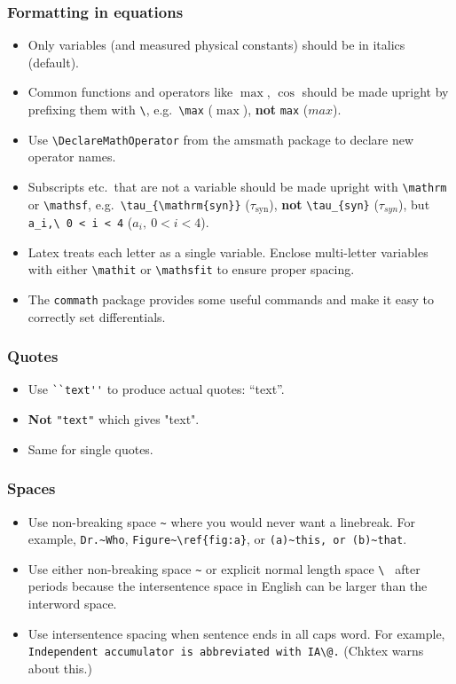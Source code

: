 \documentclass[aspectratio=1610]{beamer}
\begin{document}
\begin{frame}[fragile]
    \frametitle{Formatting in equations}
    \begin{itemize}
        \item Only variables (and measured physical constants) should be in italics (default).
        \item Common functions and operators like $\max$, $\cos$ should be made upright by prefixing them with \verb+\+, e.g.~\verb+\max+ ($\max$), \textbf{not} \verb+max+ ($max$). %
        \item Use \verb+\DeclareMathOperator+ from the amsmath package to declare new operator names.
        \item Subscripts etc.~that are not a variable should be made upright with \verb+\mathrm+ or \verb+\mathsf+, e.g.~\verb+\tau_{\mathrm{syn}}+ ($\tau_{\mathrm{syn}}$), \textbf{not} \verb+\tau_{syn}+ ($\tau_{syn}$), but \verb+a_i,\ 0 < i < 4+ ($a_i,\ 0 < i < 4$).
        \item Latex treats each letter as a single variable. Enclose multi-letter variables with either \verb+\mathit+ or \verb+\mathsfit+ to ensure proper spacing.
        \item The \verb+commath+ package provides some useful commands and make it easy to correctly set differentials.
    \end{itemize}
\end{frame}

\begin{frame}[fragile]
    \frametitle{Quotes}
    \begin{itemize}
        \item Use \verb+``text''+ to produce actual quotes: ``text''.
        \item \textbf{Not} \verb+"text"+ which gives "text". %
        \item Same for single quotes.
    \end{itemize}
\end{frame}

\begin{frame}[fragile]
    \frametitle{Spaces}
    \begin{itemize}
        \item Use non-breaking space \verb+~+ where you would never want a linebreak. For example, \verb+Dr.~Who+, \verb+Figure~\ref{fig:a}+, or \verb+(a)~this, or (b)~that+.
        \item Use either non-breaking space \verb+~+ or explicit normal length space \verb*+\ + after periods because the intersentence space in English can be larger than the interword space.
        \item Use intersentence spacing when sentence ends in all caps word. For example, \verb+Independent accumulator is abbreviated with IA\@.+ (Chktex warns about this.)
    \end{itemize}
\end{frame}
\end{document}
